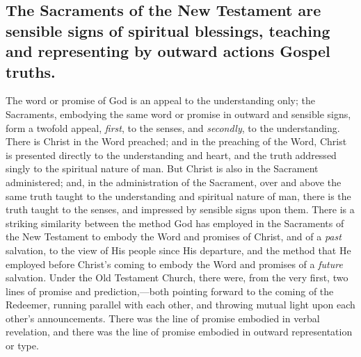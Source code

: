 \documentclass[]{book}
\begin{document}
\hypertarget{the-sacraments-of-the-new-testament-are-sensible-signs-of-spiritual-blessings-teaching-and-representing-by-outward-actions-gospel-truths.}{%
\subsection{The Sacraments of the New Testament are sensible signs of spiritual blessings, teaching and representing by outward actions Gospel truths.}\label{the-sacraments-of-the-new-testament-are-sensible-signs-of-spiritual-blessings-teaching-and-representing-by-outward-actions-gospel-truths.}}

The word or promise of God is an appeal to the understanding only; the Sacraments, embodying the same word or promise in outward and sensible signs, form a twofold appeal, \emph{first}, to the senses, and \emph{secondly}, to the understanding. There is Christ in the Word preached; and in the preaching of the Word, Christ is presented directly to the understanding and heart, and the truth addressed singly to the spiritual nature of man. But Christ is also in the Sacrament administered; and, in the administration of the Sacrament, over and above the same truth taught to the understanding and spiritual nature of man, there is the truth taught to the senses, and impressed by sensible signs upon them. There is a striking similarity between the method God has employed in the Sacraments of the New Testament to embody the Word and promises of Christ, and of a \emph{past} salvation, to the view of His people since His departure, and the method that He employed before Christ's coming to embody the Word and promises of a \emph{future} salvation. Under the Old Testament Church, there were, from the very first, two lines of promise and prediction,---both pointing forward to the coming of the Redeemer, running parallel with each other, and throwing mutual light upon each other's announcements. There was the line of promise embodied in verbal revelation, and there was the line of promise embodied in outward representation or type.
\end{document}
